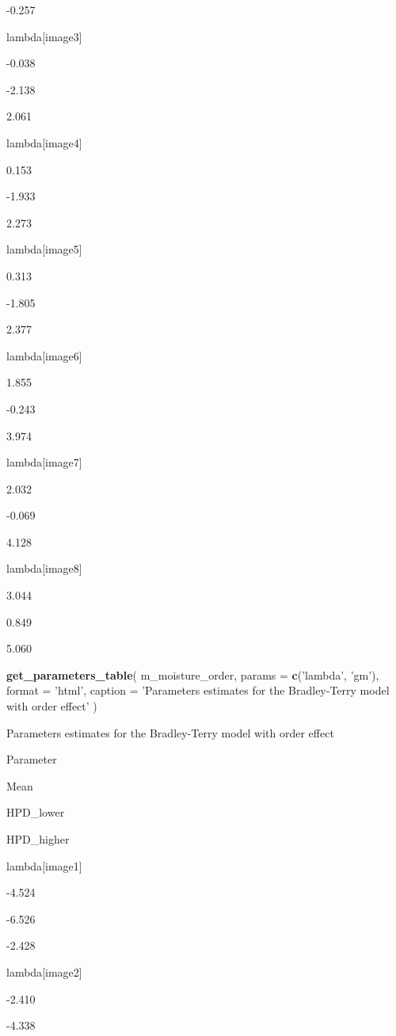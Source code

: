 \documentclass[
]{book}
\newenvironment{Shaded}{\begin{snugshade}}{\end{snugshade}}
\newcommand{\DataTypeTok}[1]{\textcolor[rgb]{0.13,0.29,0.53}{#1}}
\newcommand{\KeywordTok}[1]{\textcolor[rgb]{0.13,0.29,0.53}{\textbf{#1}}}
\newcommand{\NormalTok}[1]{#1}
\newcommand{\StringTok}[1]{\textcolor[rgb]{0.31,0.60,0.02}{#1}}
\begin{document}
-0.257

lambda{[}image3{]}

-0.038

-2.138

2.061

lambda{[}image4{]}

0.153

-1.933

2.273

lambda{[}image5{]}

0.313

-1.805

2.377

lambda{[}image6{]}

1.855

-0.243

3.974

lambda{[}image7{]}

2.032

-0.069

4.128

lambda{[}image8{]}

3.044

0.849

5.060

\begin{Shaded}
\begin{Highlighting}[]
\KeywordTok{get_parameters_table}\NormalTok{(}
\NormalTok{  m_moisture_order,}
  \DataTypeTok{params =} \KeywordTok{c}\NormalTok{(}\StringTok{'lambda'}\NormalTok{, }\StringTok{'gm'}\NormalTok{),}
  \DataTypeTok{format =} \StringTok{'html'}\NormalTok{,}
  \DataTypeTok{caption =} \StringTok{'Parameters estimates for the Bradley-Terry model with order effect'}
\NormalTok{)}
\end{Highlighting}
\end{Shaded}

\label{tab:unnamed-chunk-28}Parameters estimates for the Bradley-Terry model with order effect

Parameter

Mean

HPD\_lower

HPD\_higher

lambda{[}image1{]}

-4.524

-6.526

-2.428

lambda{[}image2{]}

-2.410

-4.338
\end{document}
